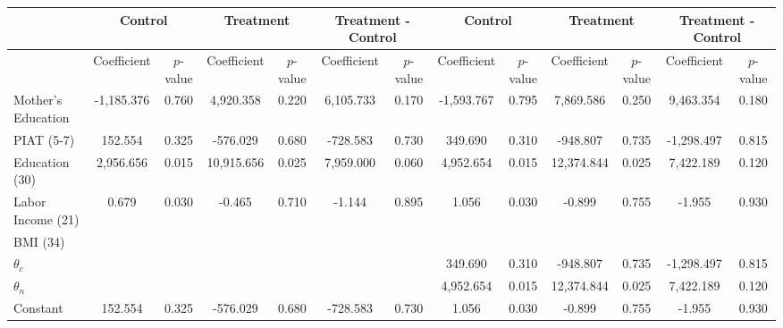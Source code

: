 \begin{tabular}{lcccccccccccc} \toprule
&\multicolumn{2}{c}{Control} & \multicolumn{2}{c}{Treatment} & \multicolumn{2}{c}{Treatment - Control} & \multicolumn{2}{c}{Control} & \multicolumn{2}{c}{Treatment} & \multicolumn{2}{c}{Treatment - Control} \\ \midrule
 & Coefficient  & $p$-value  & Coefficient  & $p$-value & Coefficient  & $p$-value  & Coefficient  & $p$-value  & Coefficient  & $p$-value  & Coefficient  & $p$-value \\ \midrule
Mother's Education & -1,185.376 &     0.760 &  4,920.358 &     0.220 &  6,105.733 &     0.170 & -1,593.767 &     0.795 &  7,869.586 &     0.250 &  9,463.354 &     0.180 \\  
PIAT (5-7) &   152.554 &     0.325 &  -576.029 &     0.680 &  -728.583 &     0.730 &   349.690 &     0.310 &  -948.807 &     0.735 & -1,298.497 &     0.815 \\  
Education (30)  &  2,956.656 &     0.015 & 10,915.656 &     0.025 &  7,959.000 &     0.060 &  4,952.654 &     0.015 & 12,374.844 &     0.025 &  7,422.189 &     0.120 \\  
Labor Income (21) &     0.679 &     0.030 &    -0.465 &     0.710 &    -1.144 &     0.895 &     1.056 &     0.030 &    -0.899 &     0.755 &    -1.955 &     0.930 \\  
BMI (34) &        &        &        &        &        &        &        &        &        &        &        &         \\
$\theta_{c}$ &        &        &        &        &        &        &   349.690 &     0.310 &  -948.807 &     0.735 & -1,298.497 &     0.815 \\  
$\theta_{n}$ &        &        &        &        &        &        &  4,952.654 &     0.015 & 12,374.844 &     0.025 &  7,422.189 &     0.120 \\  
Constant &   152.554 &     0.325 &  -576.029 &     0.680 &  -728.583 &     0.730 &     1.056 &     0.030 &    -0.899 &     0.755 &    -1.955 &     0.930 \\  
\bottomrule \end{tabular}